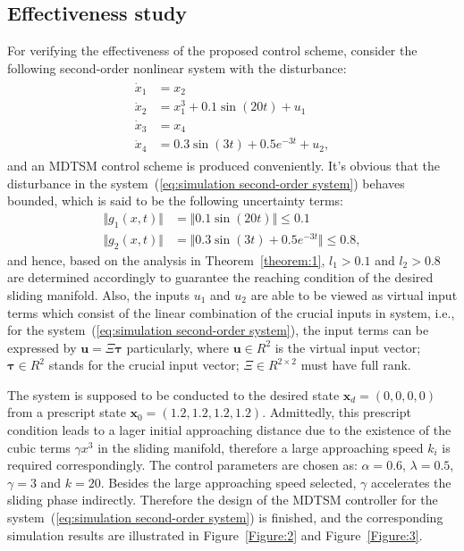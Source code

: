 \documentclass[3p]{elsarticle}
\theoremstyle{plain}
\theoremstyle{remark}
\begin{document}
\subsection{Effectiveness study}
For verifying the effectiveness of the proposed control scheme, consider the following second-order nonlinear system with the disturbance:
\begin{align}
\begin{split}
\dot x_1 &= x_2\\
\dot x_2 &= x_1^3+0.1\sin(20t)+u_1\\
\dot x_3 &= x_4\\
\dot x_4 &= 0.3\sin(3t)+0.5e^{-3t}+u_2,\label{eq:simulation second-order system}
\end{split}
\end{align}
and an MDTSM control scheme is produced conveniently. It's obvious that the disturbance in the system~(\ref{eq:simulation second-order system}) behaves bounded, which is said to be the following uncertainty terms:
\begin{align*}
\Vert g_1(x,t)\Vert &= \Vert 0.1\sin(20t)\Vert\le 0.1\\
\Vert g_2(x,t)\Vert &= \Vert 0.3\sin(3t)+0.5e^{-3t}\Vert\le 0.8,
\end{align*}
and hence, based on the analysis in Theorem~\ref{theorem:1}, $l_1>0.1$ and $l_2>0.8$ are determined accordingly to guarantee the reaching condition of the desired sliding manifold. Also, the inputs $u_1$ and $u_2$ are able to be viewed as virtual input terms which consist of the linear combination of the crucial inputs in system, i.e., for the system~(\ref{eq:simulation second-order system}), the input terms can be expressed by $\bm u = \Xi\bm\tau$ particularly, where $\bm u\in R^2$ is the virtual input vector; $\bm \tau\in R^2$ stands for the crucial input vector; $\Xi\in R^{2\times 2}$ must have full rank.\par
The system is supposed to be conducted to the desired state $\bm x_d=(0,0,0,0)$ from a prescript state $\bm x_0=(1.2,1.2,1.2,1.2)$. Admittedly, this prescript condition leads to a lager initial approaching distance due to the existence of the cubic terms $\gamma x^3$ in the sliding manifold, therefore a large approaching speed $k_i$ is required correspondingly. The control parameters are chosen as: $\alpha = 0.6$, $\lambda = 0.5$, $\gamma = 3$ and $k = 20$. Besides the large approaching speed selected, $\gamma$ accelerates the sliding phase indirectly. Therefore the design of the MDTSM controller for the system~(\ref{eq:simulation second-order system}) is finished, and the corresponding simulation results are illustrated in Figure~\ref{Figure:2} and Figure~\ref{Figure:3}.\par
\end{document}
